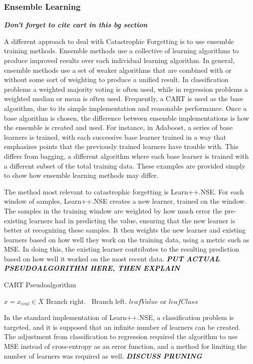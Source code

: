 	\subsubsection{Ensemble Learning}\label{bg:advanced_ensemble}
	\textbf{\textit{Don't forget to cite cart in this bg section \cite{cartIntro}}}
	\par A different approach to deal with Catastrophic Forgetting is to use ensemble training methods. Ensemble methods use a collective of learning algorithms to produce improved results over each individual learning algorithm. In general, ensemble methods use a set of weaker algorithms that are combined with or without some sort of weighting to produce a unified result. In classification problems a weighted majority voting is often used, while in regression problems a weighted median or mean is often used. Frequently, a CART is used as the base algorithm, due to its simple implementation and reasonable performance. Once a base algorithm is chosen, the difference between ensemble implementations is how the ensemble is created and used. For instance, in Adaboost, a series of base learners is trained, with each successive base learner trained in a way that emphasizes points that the previously trained learners have trouble with. This differs from bagging, a different algorithm where each base learner is trained with a different subset of the total training data. These examples are provided simply to show how ensemble learning methods may differ.
	\par The method most relevant to catastrophic forgetting is Learn++.NSE. For each window of samples, Learn++.NSE creates a new learner, trained on the window. The samples in the training window are weighted by how much error the pre-existing learners had in predicting the value, ensuring that the new learner is better at recognizing these samples. It then weights the new learner and existing learners based on how well they work on the training data, using a metric such as MSE. In doing this, the existing learner contributes to the resulting prediction based on how well it worked on the most recent data. 
	\textbf{\textit{PUT ACTUAL PSEUDOALGORITHM HERE, THEN EXPLAIN}}
		\begin{algorithm}[ht]
		\caption{CART Pseudoalgorithm}
		\label{code:bg_cart}
		\begin{algorithmic}[1]
			\State $x = x_{eval} \in X$
			 Branch right.
			\Else \ Branch left.
			\EndIf
			\EndWhile
			\State \Return $leafValue$ or $leafClass$
			\EndProcedure
		\end{algorithmic}
	\end{algorithm}
	\par In the standard implementation of Learn++.NSE, a classification problem is targeted, and it is supposed that an infinite number of learners can be created. The adjustment from classification to regression required the algorithm to use MSE instead of cross-entropy as an error function, and a method for limiting the number of learners was required as well.
	\textbf{\textit{DISCUSS PRUNING}} 
